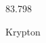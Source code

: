 \documentclass[12pt]{article}
\begin{document}
\hfill{}
\vfill
\begin{center}
  {\fontsize{50}{60}
  }

  83.798

Krypton
\end{center}
\vfill
\end{document}
